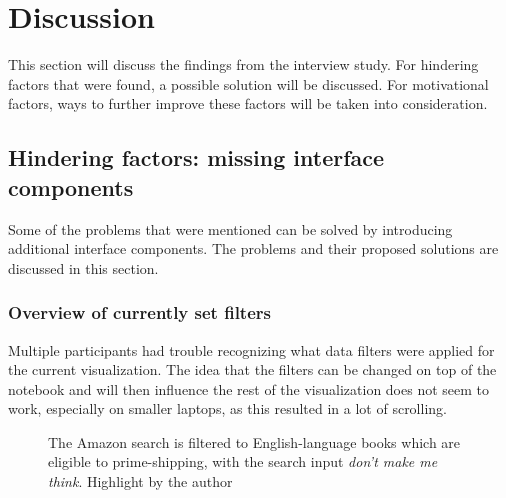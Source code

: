 \section{Discussion}
This section will discuss the findings from the interview study. For hindering factors that were found, a possible solution will be discussed. For motivational factors, ways to further improve these factors will be taken into consideration.

\subsection{Hindering factors: missing interface components}
Some of the problems that were mentioned can be solved by introducing additional interface components. The problems and their proposed solutions are discussed in this section.

\subsubsection*{Overview of currently set filters}
Multiple participants had trouble recognizing what data filters were applied for the current visualization. The idea that the filters can be changed on top of the notebook and will then influence the rest of the visualization does not seem to work, especially on smaller laptops, as this resulted in a lot of scrolling.

\begin{figure}[htbp]
    \caption{The Amazon search is filtered to English-language books which are eligible to prime-shipping, with the search input \emph{don't make me think}. Highlight by the author}
    \label{fig:amazon_filters}
\end{figure}

